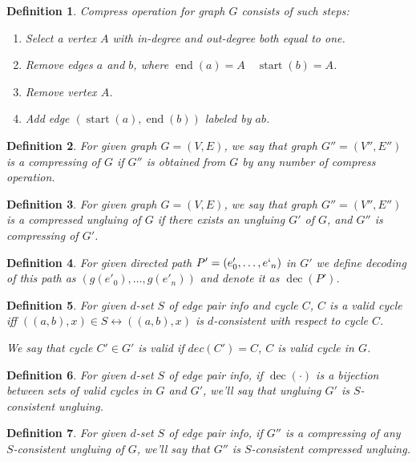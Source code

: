 \documentclass[12pt,a4paper,oneside]{article}
\newtheorem{definition}{Definition}
\begin{document}
\begin{definition}
\emph{Compress operation} for graph $G$ consists of such steps:
\begin{enumerate}
\item Select a vertex $A$ with in-degree and out-degree both equal to one. 
\item Remove edges $a$ and $b$, where $\mathop{end}(a) = A\quad \mathop{start}(b) = A$.
\item Remove vertex $A$.
\item Add edge $(\mathop{start}(a),\mathop{end}(b))$ labeled by $ab$.
\end{enumerate} 
\end{definition}
\begin{definition}
For given graph $G=(V, E)$, we say that graph $G'' = (V'', E'')$ is a \emph{compressing} of $G$ if $G''$ is obtained from $G$ by any number of compress operation.
\end{definition}
\begin{definition}
For given graph $G=(V, E)$, we say that graph $G'' = (V'', E'')$ is a \emph{compressed ungluing} of $G$ if there exists an ungluing $G'$ of $G$, and $G''$ is compressing of $G'$.
\end{definition}


\begin{definition}
For given directed path $P' = (e'_0, \ldots, e`_n)$ in $G' $ we define \emph{decoding} of this path as $(g(e'_0), \ldots, g(e'_n))$ and denote it as $\mathop{dec}(P')$.
\end{definition}

\begin{definition}

For given $d$-set $S$ of edge pair info and cycle $C$, $C$ is a \emph{valid} cycle iff $((a, b), x) \in S \leftrightarrow  ((a, b), x)$ is $d$-consistent with respect to cycle $C$.

We say that cycle $C' \in G'$ is \emph{valid} if $dec(C')=C$, $C$ is valid cycle in $G$.
\end{definition}
\begin{definition}  
For given $d$-set $S$ of edge pair info, if $\mathop{dec}(\cdot)$ is a bijection between sets of valid cycles in $G$ and $G'$, we'll say that ungluing $G'$ is \emph{$S$-consistent ungluing}.
\end{definition}

\begin{definition}  
For given $d$-set $S$ of edge pair info, if $G''$ is a compressing of any $S$-consistent ungluing of $G$, we'll say that $G''$ is \emph{$S$-consistent compressed ungluing}.
\end{definition}
\end{document}
